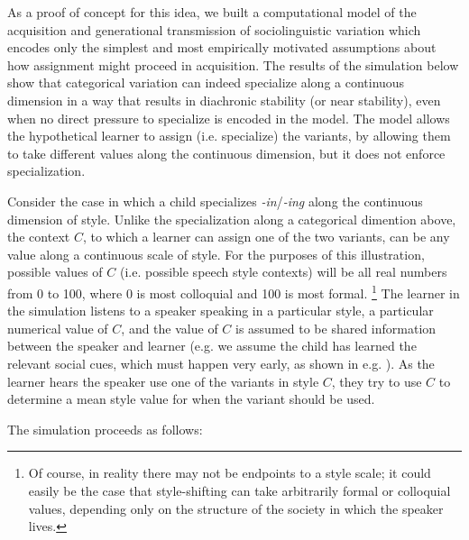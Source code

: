 As a proof of concept for this idea, we built a computational model of the acquisition and generational transmission of sociolinguistic variation which encodes only the simplest and most empirically motivated assumptions about how assignment might proceed in acquisition.
The results of the simulation below show that categorical variation can indeed specialize along a continuous dimension in a way that results in diachronic stability (or near stability), even when no direct pressure to specialize is encoded in the model.
The model allows the hypothetical learner to assign (i.e. specialize) the variants, by allowing them to take different values along the continuous dimension, but it does not enforce specialization.

Consider the case in which a child specializes \textsl{-in}/\textsl{-ing} along the continuous dimension of style.
Unlike the specialization along a categorical dimention above, the context $C$, to which a learner can assign one of the two variants, can be any value along a continuous scale of style.
For the purposes of this illustration, possible values of $C$ (i.e. possible speech style contexts) will be all real numbers from 0 to 100, where 0 is most colloquial and 100 is most formal.
\footnote{Of course, in reality there may not be endpoints to a style scale; it could easily be the case that style-shifting can take arbitrarily formal or colloquial values, depending only on the structure of the society in which the speaker lives.}
The learner in the simulation listens to a speaker speaking in a particular style, a particular numerical value of $C$, and the value of $C$ is assumed to be shared information between the speaker and learner (e.g. we assume the child has learned the relevant social cues, which must happen very early, as shown in e.g. \citealt{smithetal2007}).
As the learner hears the speaker use one of the variants in style $C$, they try to use $C$ to determine a mean style value for when the variant should be used.

The simulation proceeds as follows:

